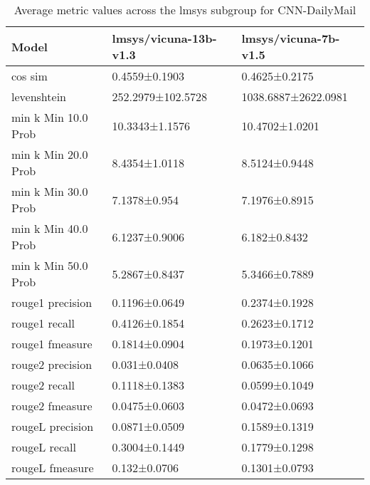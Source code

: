 \begin{table}
\caption{Average metric values across the lmsys subgroup for CNN-DailyMail}
\label{tab:}
\begin{tabular}{lll}
\toprule
Model & lmsys/vicuna-13b-v1.3 & lmsys/vicuna-7b-v1.5 \\
\midrule
cos sim & 0.4559±0.1903 & 0.4625±0.2175 \\
levenshtein & 252.2979±102.5728 & 1038.6887±2622.0981 \\
min k Min 10.0 Prob & 10.3343±1.1576 & 10.4702±1.0201 \\
min k Min 20.0 Prob & 8.4354±1.0118 & 8.5124±0.9448 \\
min k Min 30.0 Prob & 7.1378±0.954 & 7.1976±0.8915 \\
min k Min 40.0 Prob & 6.1237±0.9006 & 6.182±0.8432 \\
min k Min 50.0 Prob & 5.2867±0.8437 & 5.3466±0.7889 \\
rouge1 precision & 0.1196±0.0649 & 0.2374±0.1928 \\
rouge1 recall & 0.4126±0.1854 & 0.2623±0.1712 \\
rouge1 fmeasure & 0.1814±0.0904 & 0.1973±0.1201 \\
rouge2 precision & 0.031±0.0408 & 0.0635±0.1066 \\
rouge2 recall & 0.1118±0.1383 & 0.0599±0.1049 \\
rouge2 fmeasure & 0.0475±0.0603 & 0.0472±0.0693 \\
rougeL precision & 0.0871±0.0509 & 0.1589±0.1319 \\
rougeL recall & 0.3004±0.1449 & 0.1779±0.1298 \\
rougeL fmeasure & 0.132±0.0706 & 0.1301±0.0793 \\
\bottomrule
\end{tabular}
\end{table}

